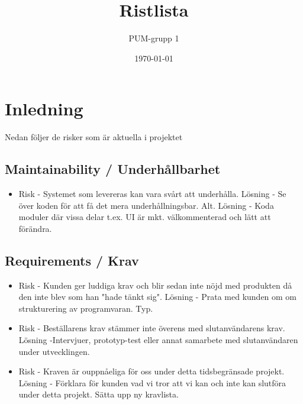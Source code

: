 

\ifpdf
\else
\fi

\title{Ristlista}
\author{PUM-grupp 1}
\date{\today}



\maketitle\thispagestyle{empty}

\newpage

\setcounter{tocdepth}{2}
\tableofcontents
\newpage

\section{Inledning}
Nedan följer de risker som är aktuella i projektet

\subsection{Maintainability / Underhållbarhet}
\begin{itemize}
\item Risk - Systemet som levereras kan vara svårt att underhålla.
Lösning - Se över koden för att få det mera underhållningsbar.
Alt. Lösning - Koda moduler där vissa delar t.ex. UI är mkt. välkommenterad och lätt att förändra.
\end{itemize}

\subsection{Requirements / Krav}
\begin{itemize}
\item Risk - Kunden ger luddiga krav och blir sedan inte nöjd med produkten då den inte blev som han "hade tänkt sig".
Lösning - Prata med kunden om om strukturering av programvaran. Typ.
\item Risk - Beställarens krav stämmer inte överens med slutanvändarens krav.
Lösning -Intervjuer, prototyp-test eller annat samarbete med slutanvändaren under utvecklingen.
\item Risk - Kraven är ouppnåeliga för oss under detta tidsbegränsade projekt.
Lösning - Förklara för kunden vad vi tror att vi kan och inte kan slutföra under detta projekt. Sätta upp ny kravlista.
\end{itemize}


